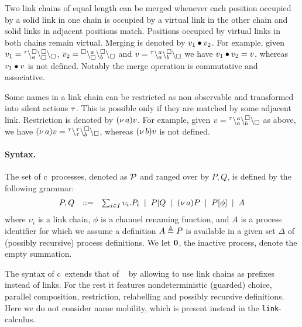 Two link chains of equal length can be merged whenever each position occupied by a solid link in one chain is occupied by a virtual link in the other chain and solid links in adjacent positions match. Positions occupied by virtual links in both chains remain virtual. Merging is denoted by $v_1 \bullet v_2$.
%
For example, given $v_1 = {}^{\tau}\backslash_{a}^{\scriptstyle {\square}}\backslash_{\scriptstyle {\square}}^{\scriptstyle {\square}}\backslash_{\scriptstyle {\square}}$, $v_2 = {}^{\scriptstyle {\square}}\backslash_{\scriptstyle {\square}}^{a}\backslash_{b}^{\scriptstyle {\square}}\backslash_{\scriptstyle {\square}}$ and $v = {}^{\tau}\backslash_{a}^{a}\backslash_{b}^{\scriptstyle {\square}}\backslash_{\scriptstyle {\square}}$
we have $v_1 \bullet v_2 = v$, whereas $v_1 \bullet v$ is not defined. Notably the merge operation is commutative and associative.

Some names in a link chain can be restricted as non observable and transformed into silent actions $\tau$. This is possible only if they are matched by some adjacent link. Restriction is denoted by $(\nu\, a)v$.
%
For example, given $v = {}^{\tau}\backslash_{a}^{a}\backslash_{b}^{\scriptstyle {\square}}\backslash_{\scriptstyle {\square}}$ as above, we have 
$(\nu\, a)v = {}^{\tau}\backslash_{\tau}^{\tau}\backslash_{b}^{\scriptstyle {\square}}\backslash_{\scriptstyle {\square}}$,
whereas $(\nu\, b)v$ is not defined.

\paragraph{Syntax.}
The set of c\CNA\ processes, denoted as $\cal{P}$ and ranged over by $P,Q$, is defined by the following grammar:
\[
\begin{array}{rcl}
P,Q & ::= &
\sum_{i\in I} \upsilon_i.P_i \;\mid\;
P|Q \;\mid\;
(\nu\, a) P \;\mid\;
P[\phi] \;\mid\;
A
\end{array}
\]
\noindent
where $\upsilon_i$ is a  link chain,
$\phi$ is a channel renaming function,
and $A$ is a process identifier for which we assume a definition $A
\triangleq P$ is available in a given set $\Delta$ of (possibly
recursive) process definitions. We let $\mathbf{0}$, the inactive process,
denote the empty summation.

The syntax of c\CNA\  extends that of \CNA~\cite{BBB17} by allowing to use link chains as prefixes instead of links.
For the rest it features nondeterministic (guarded) choice, parallel composition, restriction, relabelling and possibly recursive definitions. Here we do not consider name mobility, which is present instead in the {\tt link}-calculus.
